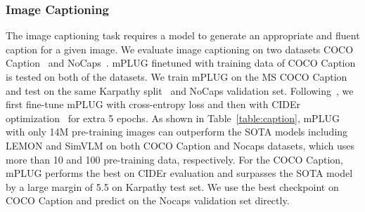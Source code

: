 \documentclass[11pt]{article}
\newcommand{\modelname}{mPLUG }
\begin{document}
\subsubsection{Image Captioning} The image captioning task requires a model to generate an appropriate and fluent caption for a given image. We evaluate image captioning on two datasets COCO Caption~\cite{coco_caption} and NoCaps~\cite{nocaps}. \modelname finetuned with training data of COCO Caption is tested on both of the datasets. We train \modelname on the MS COCO Caption and test on the same Karpathy split~\cite{li2020oscar,wang2021simvlm} and NoCaps validation set. Following~\cite{li2020oscar,wang2022OFA}, we first fine-tune \modelname with cross-entropy loss and then with CIDEr optimization~\cite{scst} for extra 5 epochs. As shown in Table~\ref{table:caption}, \modelname with only 14M pre-training images can outperform the SOTA models including LEMON and SimVLM on both COCO Caption and Nocaps datasets, which uses more than 10 and 100 pre-training data, respectively. For the COCO Caption, \modelname performs the best on CIDEr evaluation and surpasses the SOTA model by a large margin of 5.5 on Karpathy test set. We use the best checkpoint on COCO Caption and predict on the Nocaps validation set directly.
\end{document}

